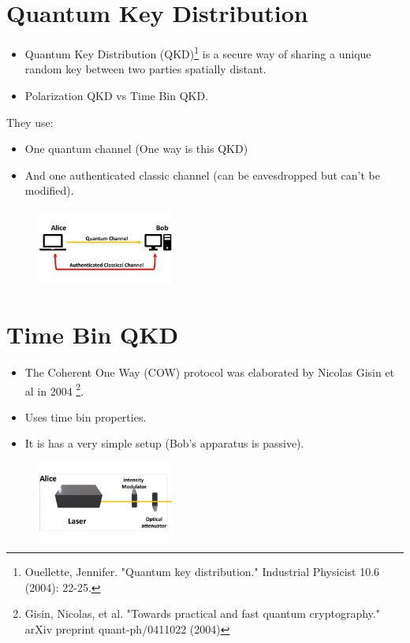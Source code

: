 \documentclass[1000pt]{article}
\newcommand{\mysection}[1]{\section*{\color{black}\sffamily #1}}%
\begin{document}
\mysection{\Huge\textbf{ Quantum Key Distribution}} \Large \vspace*{1cm}
\begin{itemize}
\item Quantum Key Distribution (QKD)\footnote {\centering Ouellette, Jennifer. "Quantum key distribution." Industrial Physicist 10.6 (2004): 22-25.} is a secure way of sharing a unique random key between two parties spatially distant. 
\item Polarization QKD vs Time Bin QKD.
\end{itemize}
They use:
\begin{itemize}
\item One quantum channel (One way is this QKD)
\item And one authenticated classic channel (can be eavesdropped but can't be modified).
\end{itemize}
  \begin{figure}[hbt]
    	\centering
    	\includegraphics[width=0.4\textwidth]{./figures/Full.pdf}
    \end{figure}
\mysection{\Huge\textbf{Time Bin QKD}} \Large \vspace*{1cm}
\begin{itemize}

\item The Coherent One Way (COW) protocol was elaborated by Nicolas Gisin et al in 2004 \footnote{ \centering Gisin, Nicolas, et al. "Towards practical and fast quantum cryptography." arXiv preprint quant-ph/0411022 (2004)}. 

\item Uses time bin properties.

\item It is has a very simple setup (Bob's apparatus is passive).
\end{itemize}
    \begin{figure}[hbt]
    	\centering
    	\includegraphics[width=0.4\textwidth]{./figures/A.pdf}
        	\label{bob}
    \end{figure}
\end{document}
